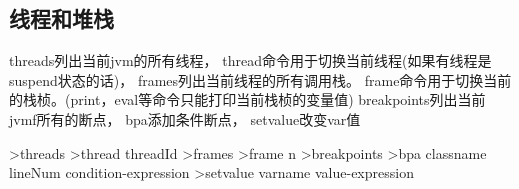 \documentclass[oneside,openany]{book}
\begin{document}
    

  \subsection{线程和堆栈}
  threads列出当前jvm的所有线程， thread命令用于切换当前线程(如果有线程是suspend状态的话)，
  frames列出当前线程的所有调用栈。 frame命令用于切换当前的栈桢。(print，eval等命令只能打印当前栈桢的变量值)
  breakpoints列出当前jvmf所有的断点， bpa添加条件断点， setvalue改变var值
    \begin{mdframed}[style=SmallFrame]
      \begin{flushleft}
      >threads\newline
      >thread threadId\newline
      >frames\newline
      >frame n\newline
      >breakpoints\newline
      >bpa classname lineNum condition-expression\newline
      >setvalue  varname value-expression\newline
      \end{flushleft}
    \end{mdframed}
\end{document}
